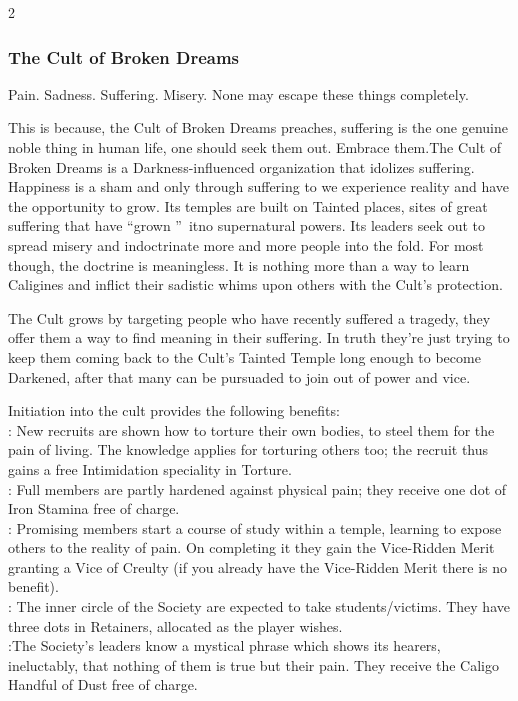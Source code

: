 \begin{multicols}{2}
\subsubsection*{The Cult of Broken Dreams}

Pain. Sadness. Suffering. Misery. None may escape these things completely. 

This is because, the Cult of Broken Dreams preaches, suffering is the one genuine noble thing in human life, one should seek them out. Embrace them.The Cult of Broken Dreams is a Darkness-influenced organization that idolizes suffering. Happiness is a sham and only through suffering to we experience reality and have the opportunity to grow. Its temples are built on Tainted places, sites of great suffering that have \textquotedblleft grown \textquotedblright\, itno supernatural powers. Its leaders seek out to spread misery and indoctrinate more and more people into the fold. For most though, the doctrine is meaningless. It is nothing more than a way to learn Caligines and inflict their sadistic whims upon others with the Cult's protection. 

The Cult grows by targeting people who have recently suffered a tragedy, they offer them a way to find meaning in their suffering. In truth they're just trying to keep them coming back to the Cult's Tainted Temple long enough to become Darkened, after that many can be pursuaded to join out of power and vice. 

Initiation into the cult provides the following benefits: \\

\noindent \textbullet: New recruits are shown how to torture their own bodies, to steel them for the pain of living. The knowledge applies for torturing others too; the recruit thus gains a free Intimidation speciality in Torture.\\
\noindent \textbullet\textbullet: Full members are partly hardened against physical pain; they receive one dot of Iron Stamina free of charge.\\
\noindent \textbullet\textbullet\textbullet: Promising members start a course of study within a temple, learning to expose others to the reality
of pain. On completing it they gain the Vice-Ridden Merit granting a Vice of Creulty (if you already have the Vice-Ridden Merit there is no benefit).\\
\noindent \textbullet\textbullet\textbullet\textbullet: The inner circle of the Society are expected to take students/victims. They have three dots in Retainers, allocated as the player wishes.\\
\noindent \textbullet\textbullet\textbullet\textbullet\textbullet:The Society’s leaders know a mystical phrase which shows its hearers, ineluctably, that nothing of them is true but their pain. They receive the Caligo Handful of Dust free of charge.


\end{multicols}
